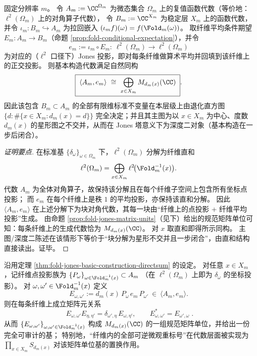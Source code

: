 \begin{theorem}\label{thm:fold-jones-basic-construction-directsum}
固定分辨率 \(m\)。
令
\(
A_m:=\CC^{\Omega_m}
\)
为微态集合 \(\Omega_m\) 上的复值函数代数（等价地：\(\ell^2(\Omega_m)\) 上的对角算子代数），
令
\(
B_m:=\CC^{X_m}
\)
为稳定层 \(X_m\) 上的函数代数，并令 \(\iota_m:B_m\hookrightarrow A_m\) 为拉回嵌入 \((\iota_m f)(\omega)=f(\Fold_m(\omega))\)。
取纤维平均条件期望 \(E_m:A_m\to B_m\)（命题 \ref{prop:fold-conditional-expectation}），并令
\[
e_m:=\iota_m\circ E_m:\ \ell^2(\Omega_m)\to \ell^2(\Omega_m)
\]
为对应的（\(\ell^2\) 口径下）Jones 投影，即对每条纤维做算术平均并回填到该纤维上的正交投影。
则基本构造代数满足自然同构
\[
\boxed{\;
\langle A_m,e_m\rangle
\ \cong\
\bigoplus_{x\in X_m} M_{d_m(x)}(\CC)\; }.
\]
因此该包含 \(B_m\subset A_m\) 的全部有限维标准不变量在本层级上由退化直方图
\(
\{d:\#\{x\in X_m:d_m(x)=d\}\}
\)
完全决定；并且其主图为以 \(x\in X_m\) 为中心、度数 \(d_m(x)\) 的星形图之不交并，从而在 Jones 塔意义下为深度二对象（基本构造在一步后闭合）。
\end{theorem}

\begin{proof}[证明要点]
在标准基 \(\{\delta_\omega\}_{\omega\in\Omega_m}\) 下，\(\ell^2(\Omega_m)\) 分解为纤维直和
\[
\ell^2(\Omega_m)=\bigoplus_{x\in X_m}\ell^2\!\bigl(\Fold_m^{-1}(x)\bigr).
\]
代数 \(A_m\) 为全体对角算子，故保持该分解且在每个纤维子空间上包含所有坐标点投影；
而 \(e_m\) 在每个纤维上是秩 \(1\) 的平均投影，亦保持该直和分解。
因此 \(\langle A_m,e_m\rangle\) 在上述分解下为块对角代数，其每一块由“纤维上的点投影 + 纤维平均投影”生成。
由命题 \ref{prop:fold-jones-matrix-units}（见下）给出的规范矩阵单位可知：每条纤维上的生成代数恰为 \(M_{d_m(x)}(\CC)\)。
对 \(x\) 取直和即得所示同构。
主图/深度二陈述在该情形下等价于“块分解为星形不交并且一步闭合”，由直和结构直接读出。证毕。
\end{proof}

\begin{proposition}\label{prop:fold-jones-matrix-units}
沿用定理 \ref{thm:fold-jones-basic-construction-directsum} 的设定。
对任意 \(x\in X_m\)，记纤维点投影族为
\(
\{P_\omega\}_{\omega\in \Fold_m^{-1}(x)}\subset A_m
\)
（在 \(\ell^2(\Omega_m)\) 上即为 \(\delta_\omega\) 的坐标投影）。
对 \(\omega,\omega'\in \Fold_m^{-1}(x)\) 定义
\[
E_{\omega,\omega'}:=d_m(x)\,P_\omega\,e_m\,P_{\omega'}\ \in\ \langle A_m,e_m\rangle.
\]
则在每条纤维上成立矩阵元关系
\[
\boxed{\;
E_{\omega,\omega'}E_{\eta,\eta'}=\delta_{\omega',\eta}\,E_{\omega,\eta'},
\qquad
E_{\omega,\omega'}^{\ast}=E_{\omega',\omega}\; }.
\]
从而 \(\{E_{\omega,\omega'}\}_{\omega,\omega'\in\Fold_m^{-1}(x)}\) 构成 \(M_{d_m(x)}(\CC)\) 的一组规范矩阵单位，并给出一份完全可审计的基；
特别地，“纤维内的全部可逆微观重标号”在代数层面被实现为
\(
\prod_{x\in X_m}S_{d_m(x)}
\)
对该矩阵单位基的置换作用。
\end{proposition}

